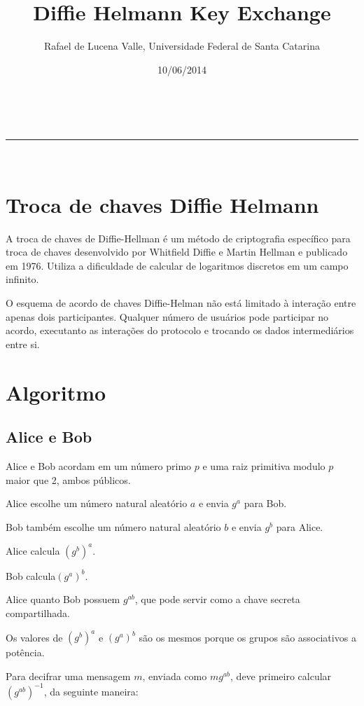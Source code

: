 \documentclass[a4paper,11pt]{article}
\makeatletter
\newcommand{\linia}{\rule{\linewidth}{0.5pt}}
\theoremstyle{mytheor}
\renewcommand{\maketitle}{
\begin{center}
\vspace{2ex}
{\huge \textsc{\@title}}
\vspace{1ex}
\\
\linia\\
\@author \hfill \@date
\vspace{4ex}
\end{center}
}
\makeatother
\begin{document}
\title{Diffie Helmann Key Exchange}

\author{Rafael de Lucena Valle, Universidade Federal de Santa Catarina}

\date{10/06/2014}

\maketitle

\section*{Troca de chaves Diffie Helmann}

A troca de chaves de Diffie-Hellman é um método de criptografia específico para troca de chaves desenvolvido por Whitfield Diffie e Martin Hellman e publicado em 1976. Utiliza a dificuldade de calcular de logaritmos discretos em um campo infinito.

O esquema de acordo de chaves Diffie-Helman não está limitado à interação entre apenas dois participantes. Qualquer número de usuários pode participar no acordo, executanto as interações do protocolo e trocando os dados intermediários entre si. 

\section*{Algoritmo}

\subsection*{Alice e Bob}
    Alice e Bob acordam em um número primo $p$ e uma raiz primitiva modulo $p$ maior que 2, ambos públicos. 
    
    Alice escolhe um número natural aleatório $a$ e envia $g^a$ para Bob.
    
    Bob também escolhe um número natural aleatório $b$ e envia $g^b$ para Alice.
    
    Alice calcula $(g^b)^a$.
    
    Bob calcula$(g^a)^b$.

    Alice quanto Bob possuem $g^{ab}$, que pode servir como a chave secreta compartilhada.
    
    Os valores de $(g^b)^a$ e $(g^a)^b$ são os mesmos porque os grupos são associativos a potência.
    
    Para decifrar uma mensagem $m$, enviada como $mg^{ab}$, deve primeiro calcular $(g^{ab})^{-1}$, da seguinte maneira:
    
\end{document}
